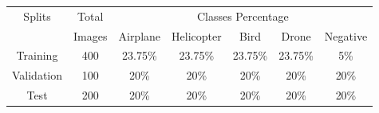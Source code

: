 
\begin{tabular}{c c c c c c c}
  \toprule[1.5pt]
  Splits    &Total &\multicolumn{5}{c}{Classes Percentage}\\
            &Images& Airplane & Helicopter & Bird & Drone & Negative\\
  \midrule
  Training  &400   &23.75\%   &23.75\%     &23.75\% &23.75\%       &5\%\\
  \midrule
  Validation&100   &20\%      &20\%        &20\%    &20\%          &20\%\\
  \midrule
  Test      &200   &20\%      &20\%        &20\%    &20\%          &20\%\\
  \bottomrule[1.5pt]
\end{tabular}